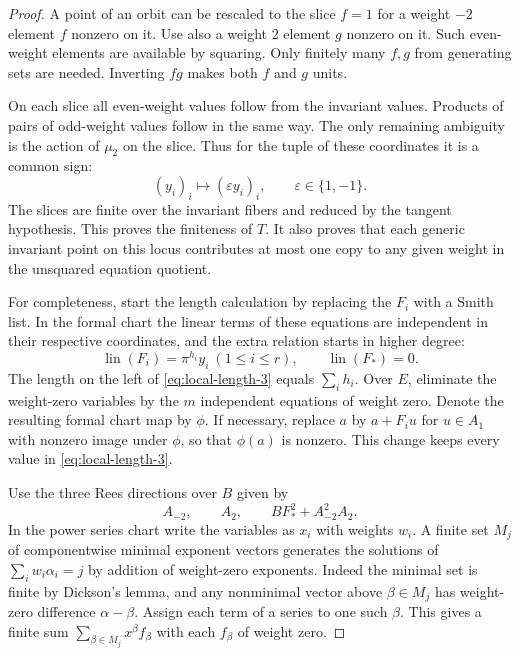 \begin{proof}
A point of an orbit can be rescaled to the
slice \(f=1\) for a weight \(-2\) element \(f\) nonzero
on it. Use also a weight \(2\) element \(g\) nonzero on
it. Such even-weight elements are available by squaring.
Only finitely many \(f,g\) from generating sets are
needed. Inverting \(fg\) makes both \(f\) and \(g\) units.

On each slice all even-weight values follow from the
invariant values. Products of pairs of odd-weight values
follow in the same way. The only remaining ambiguity is the action of \(\mu_2\) on the slice. Thus for the tuple of these coordinates it is a common sign:
\[
 (y_i)_i\longmapsto(\varepsilon y_i)_i,\qquad\varepsilon\in\{1,-1\}.
\] The slices are finite over the invariant fibers
and reduced by the tangent hypothesis. This proves the
finiteness of \(T\). It also proves that each generic
invariant point on this locus contributes at most one
copy to any given weight in the unsquared equation quotient.

For completeness, start the length calculation by replacing
the \(F_i\) with a Smith list. In the formal chart the linear terms of these equations are independent in their respective coordinates, and the extra relation starts in higher degree:
\[
 \operatorname{lin}(F_i)=\pi^{h_i}y_i\ (1\le i\le r),\qquad \operatorname{lin}(F_*)=0 .
\] The length on the left of
\eqref{eq:local-length-3} equals \(\sum_i h_i\). Over \(E\), eliminate the
weight-zero variables by the \(m\) independent equations
of weight zero. Denote the resulting formal chart map
by \(\phi\). If necessary, replace \(a\) by
\(a+F_i u\) for \(u\in A_1\) with nonzero image under
\(\phi\), so that \(\phi(a)\) is nonzero. This change
keeps every value in \eqref{eq:local-length-3}.

Use the three Rees directions over \(B\) given by
\[
        A_{-2},\qquad A_2,\qquad BF_*^2+A_{-2}^2A_2.
        \tag{4}\label{eq:local-length-4}
\]
In the power series chart write the variables as \(x_i\)
with weights \(w_i\). A finite set \(M_j\) of componentwise
minimal exponent vectors generates the solutions of
\(\sum_i w_i\alpha_i=j\) by addition of weight-zero exponents.
Indeed the minimal set is finite by Dickson's lemma, and any
nonminimal vector above \(\beta\in M_j\) has weight-zero difference
\(\alpha-\beta\). Assign each term of a series to one such \(\beta\).
This gives a finite sum \(\sum_{\beta\in M_j}x^\beta f_\beta\)
with each \(f_\beta\) of weight zero.


\end{proof}
